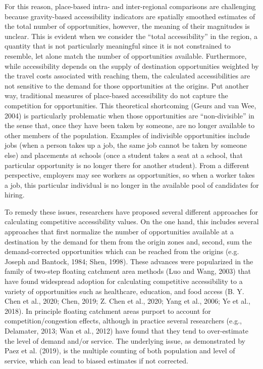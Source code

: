 \documentclass[]{elsarticle} %
\begin{document}
For this reason, place-based intra- and inter-regional comparisons are
challenging because gravity-based accessibility indicators are spatially
smoothed estimates of the total number of opportunities, however, the
meaning of their magnitudes is unclear. This is evident when we consider
the ``total accessibility'' in the region, a quantity that is not
particularly meaningful since it is not constrained to resemble, let
alone match the number of opportunities available. Furthermore, while
accessibility depends on the supply of destination opportunities
weighted by the travel costs associated with reaching them, the
calculated accessibilities are not sensitive to the demand for those
opportunities at the origins. Put another way, traditional measures of
place-based accessibility do not capture the competition for
opportunities. This theoretical shortcoming (Geurs and van Wee, 2004) is
particularly problematic when those opportunities are ``non-divisible''
in the sense that, once they have been taken by someone, are no longer
available to other members of the population. Examples of indivisible
opportunities include jobs (when a person takes up a job, the same job
cannot be taken by someone else) and placements at schools (once a
student takes a seat at a school, that particular opportunity is no
longer there for another student). From a different perspective,
employers may see workers as opportunities, so when a worker takes a
job, this particular individual is no longer in the available pool of
candidates for hiring.

To remedy these issues, researchers have proposed several different
approaches for calculating competitive accessibility values. On the one
hand, this includes several approaches that first normalize the number
of opportunities available at a destination by the demand for them from
the origin zones and, second, sum the demand-corrected opportunities
which can be reached from the origins (e.g. Joseph and Bantock, 1984;
Shen, 1998). These advances were popularized in the family of two-step
floating catchment area methods (Luo and Wang, 2003) that have found
widespread adoption for calculating competitive accessibility to a
variety of opportunities such as healthcare, education, and food access
(B. Y. Chen et al., 2020; Chen, 2019; Z. Chen et al., 2020; Yang et al.,
2006; Ye et al., 2018). In principle floating catchment areas purport to
account for competition/congestion effects, although in practice several
researchers (e.g., Delamater, 2013; Wan et al., 2012) have found that
they tend to over-estimate the level of demand and/or service. The
underlying issue, as demonstrated by Paez et al. (2019), is the multiple
counting of both population and level of service, which can lead to
biased estimates if not corrected.
\end{document}
